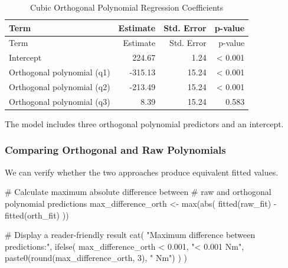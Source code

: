 \documentclass[
  letterpaper,
  DIV=11,
  numbers=noendperiod]{scrreprt}
\newenvironment{Shaded}{\begin{snugshade}}{\end{snugshade}}
\newcommand{\CommentTok}[1]{\textcolor[rgb]{0.37,0.37,0.37}{#1}}
\newcommand{\DecValTok}[1]{\textcolor[rgb]{0.68,0.00,0.00}{#1}}
\newcommand{\FloatTok}[1]{\textcolor[rgb]{0.68,0.00,0.00}{#1}}
\newcommand{\FunctionTok}[1]{\textcolor[rgb]{0.28,0.35,0.67}{#1}}
\newcommand{\NormalTok}[1]{\textcolor[rgb]{0.00,0.23,0.31}{#1}}
\newcommand{\OtherTok}[1]{\textcolor[rgb]{0.00,0.23,0.31}{#1}}
\newcommand{\SpecialCharTok}[1]{\textcolor[rgb]{0.37,0.37,0.37}{#1}}
\newcommand{\StringTok}[1]{\textcolor[rgb]{0.13,0.47,0.30}{#1}}
\begin{document}
\begin{longtable}[]{@{}lrrr@{}}
\caption{Cubic Orthogonal Polynomial Regression
Coefficients}\tabularnewline
\toprule\noalign{}
Term & Estimate & Std. Error & p-value \\
\midrule\noalign{}
\endfirsthead
\toprule\noalign{}
Term & Estimate & Std. Error & p-value \\
\midrule\noalign{}
\endhead
\bottomrule\noalign{}
\endlastfoot
Intercept & 224.67 & 1.24 & \textless{} 0.001 \\
Orthogonal polynomial (q1) & -315.13 & 15.24 & \textless{} 0.001 \\
Orthogonal polynomial (q2) & -213.49 & 15.24 & \textless{} 0.001 \\
Orthogonal polynomial (q3) & 8.39 & 15.24 & 0.583 \\
\end{longtable}

The model includes three orthogonal polynomial predictors and an
intercept.

\subsubsection{Comparing Orthogonal and Raw
Polynomials}\label{comparing-orthogonal-and-raw-polynomials}

We can verify whether the two approaches produce equivalent fitted
values.

\begin{Shaded}
\begin{Highlighting}[]
\CommentTok{\# Calculate maximum absolute difference between}
\CommentTok{\# raw and orthogonal polynomial predictions}
\NormalTok{max\_difference\_orth }\OtherTok{\textless{}{-}} \FunctionTok{max}\NormalTok{(}\FunctionTok{abs}\NormalTok{(}
  \FunctionTok{fitted}\NormalTok{(raw\_fit) }\SpecialCharTok{{-}} \FunctionTok{fitted}\NormalTok{(orth\_fit)}
\NormalTok{))}

\CommentTok{\# Display a reader{-}friendly result}
\FunctionTok{cat}\NormalTok{(}
  \StringTok{"Maximum difference between predictions:"}\NormalTok{,}
  \FunctionTok{ifelse}\NormalTok{(}
\NormalTok{    max\_difference\_orth }\SpecialCharTok{\textless{}} \FloatTok{0.001}\NormalTok{,}
    \StringTok{"\textless{} 0.001 Nm"}\NormalTok{,}
    \FunctionTok{paste0}\NormalTok{(}\FunctionTok{round}\NormalTok{(max\_difference\_orth, }\DecValTok{3}\NormalTok{), }\StringTok{" Nm"}\NormalTok{)}
\NormalTok{  )}
\NormalTok{)}
\end{Highlighting}
\end{Shaded}
\end{document}
